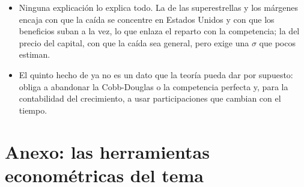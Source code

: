 \documentclass[11pt]{article}
\begin{document}
\begin{itemize}
\item Ninguna explicación lo explica todo. La de las superestrellas y los márgenes encaja con que la caída se concentre en Estados Unidos y con que los beneficios suban a la vez, lo que enlaza el reparto con la competencia; la del precio del capital, con que la caída sea general, pero exige una $\sigma$ que pocos estiman.
\item El quinto hecho de  ya no es un dato que la teoría pueda dar por supuesto: obliga a abandonar la Cobb-Douglas o la competencia perfecta y, para la contabilidad del crecimiento, a usar participaciones que cambian con el tiempo.
\end{itemize}
\section{Anexo: las herramientas econométricas del tema}\label{anexo:econometria}
\end{document}
